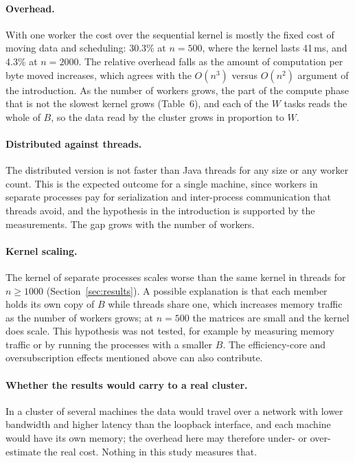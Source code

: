 \documentclass[11pt,a4paper]{article}
\begin{document}
\paragraph{Overhead.} With one worker the cost over the sequential kernel is mostly the
fixed cost of moving data and scheduling: 30.3\% at $n=500$, where the kernel lasts 41\,ms,
and 4.3\% at $n=2000$. The relative overhead falls as the amount of computation per byte moved
increases, which agrees with the $O(n^3)$ versus $O(n^2)$ argument of the introduction. As the
number of workers grows, the part of the compute phase that is not the slowest kernel grows
(Table~6), and each of the $W$ tasks reads the whole of $B$, so the data read by the cluster
grows in proportion to $W$.

\paragraph{Distributed against threads.} The distributed version is not faster than Java
threads for any size or any worker count. This is the expected outcome for a single machine,
since workers in separate processes pay for serialization and inter-process communication that
threads avoid, and the hypothesis in the introduction is supported by the measurements. The
gap grows with the number of workers.

\paragraph{Kernel scaling.} The kernel of separate processes scales worse than the same kernel
in threads for $n\ge1000$ (Section~\ref{sec:results}). A possible explanation is that each
member holds its own copy of $B$ while threads share one, which increases memory traffic as the
number of workers grows; at $n=500$ the matrices are small and the kernel does scale. This
hypothesis was not tested, for example by measuring memory traffic or by running the
processes with a smaller $B$. The efficiency-core and oversubscription effects mentioned above
can also contribute.

\paragraph{Whether the results would carry to a real cluster.} In a cluster of several
machines the data would travel over a network with lower bandwidth and higher latency than the
loopback interface, and each machine would have its own memory; the overhead here may therefore
under- or over-estimate the real cost. Nothing in this study measures that.
\end{document}
